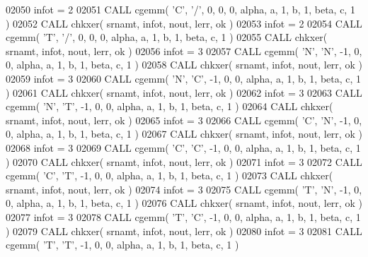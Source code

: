 \begin{DoxyCode}
02050       infot = 2
02051       \textcolor{keyword}{CALL }cgemm( \textcolor{stringliteral}{'C'}, \textcolor{stringliteral}{'/'}, 0, 0, 0, alpha, a, 1, b, 1, beta, c, 1 )
02052       \textcolor{keyword}{CALL }chkxer( srnamt, infot, nout, lerr, ok )
02053       infot = 2
02054       \textcolor{keyword}{CALL }cgemm( \textcolor{stringliteral}{'T'}, \textcolor{stringliteral}{'/'}, 0, 0, 0, alpha, a, 1, b, 1, beta, c, 1 )
02055       \textcolor{keyword}{CALL }chkxer( srnamt, infot, nout, lerr, ok )
02056       infot = 3
02057       \textcolor{keyword}{CALL }cgemm( \textcolor{stringliteral}{'N'}, \textcolor{stringliteral}{'N'}, -1, 0, 0, alpha, a, 1, b, 1, beta, c, 1 )
02058       \textcolor{keyword}{CALL }chkxer( srnamt, infot, nout, lerr, ok )
02059       infot = 3
02060       \textcolor{keyword}{CALL }cgemm( \textcolor{stringliteral}{'N'}, \textcolor{stringliteral}{'C'}, -1, 0, 0, alpha, a, 1, b, 1, beta, c, 1 )
02061       \textcolor{keyword}{CALL }chkxer( srnamt, infot, nout, lerr, ok )
02062       infot = 3
02063       \textcolor{keyword}{CALL }cgemm( \textcolor{stringliteral}{'N'}, \textcolor{stringliteral}{'T'}, -1, 0, 0, alpha, a, 1, b, 1, beta, c, 1 )
02064       \textcolor{keyword}{CALL }chkxer( srnamt, infot, nout, lerr, ok )
02065       infot = 3
02066       \textcolor{keyword}{CALL }cgemm( \textcolor{stringliteral}{'C'}, \textcolor{stringliteral}{'N'}, -1, 0, 0, alpha, a, 1, b, 1, beta, c, 1 )
02067       \textcolor{keyword}{CALL }chkxer( srnamt, infot, nout, lerr, ok )
02068       infot = 3
02069       \textcolor{keyword}{CALL }cgemm( \textcolor{stringliteral}{'C'}, \textcolor{stringliteral}{'C'}, -1, 0, 0, alpha, a, 1, b, 1, beta, c, 1 )
02070       \textcolor{keyword}{CALL }chkxer( srnamt, infot, nout, lerr, ok )
02071       infot = 3
02072       \textcolor{keyword}{CALL }cgemm( \textcolor{stringliteral}{'C'}, \textcolor{stringliteral}{'T'}, -1, 0, 0, alpha, a, 1, b, 1, beta, c, 1 )
02073       \textcolor{keyword}{CALL }chkxer( srnamt, infot, nout, lerr, ok )
02074       infot = 3
02075       \textcolor{keyword}{CALL }cgemm( \textcolor{stringliteral}{'T'}, \textcolor{stringliteral}{'N'}, -1, 0, 0, alpha, a, 1, b, 1, beta, c, 1 )
02076       \textcolor{keyword}{CALL }chkxer( srnamt, infot, nout, lerr, ok )
02077       infot = 3
02078       \textcolor{keyword}{CALL }cgemm( \textcolor{stringliteral}{'T'}, \textcolor{stringliteral}{'C'}, -1, 0, 0, alpha, a, 1, b, 1, beta, c, 1 )
02079       \textcolor{keyword}{CALL }chkxer( srnamt, infot, nout, lerr, ok )
02080       infot = 3
02081       \textcolor{keyword}{CALL }cgemm( \textcolor{stringliteral}{'T'}, \textcolor{stringliteral}{'T'}, -1, 0, 0, alpha, a, 1, b, 1, beta, c, 1 )

\end{DoxyCode}
